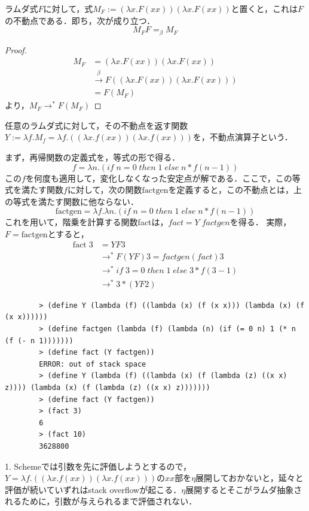 \documentclass[uplatex, dvipdfmx]{jsreport}
\begin{document}
\begin{proposition}
    ラムダ式$F$に対して，式$M_F:=(\lambda x.F(xx))(\lambda x.F(xx))$と置くと，これは$F$の不動点である．即ち，次が成り立つ．
    \[ M_FF=_\beta M_F \]
\end{proposition}
\begin{proof}
    \begin{align*}
        M_F &= (\lambda x.F(xx))(\lambda x.F(xx)) \\
        &\xrightarrow{\beta} F((\lambda x.F(xx))(\lambda x.F(xx))) \\
        &= F(M_F)
    \end{align*}
    より，$M_F\to^*F(M_F)$
\end{proof}
\begin{definition}
    任意のラムダ式に対して，その不動点を返す関数$Y:=\lambda f.M_f=\lambda f.((\lambda x.f(xx))(\lambda x.f(xx)))$を，不動点演算子という．
\end{definition}

\begin{example}[再帰関数の表現：階乗]
    まず，再帰関数の定義式を，等式の形で得る．
    \[ f=\lambda n.(if\; n=0\;then\;1\;else\;n*f(n-1)) \]
    この$f$を何度も適用して，変化しなくなった安定点が解である．ここで，この等式を満たす関数$f$に対して，次の関数$\mathrm{factgen}$を定義すると，この不動点とは，上の等式を満たす関数に他ならない．
    \[ \mathrm{factgen}=\lambda f.\lambda n.(if\; n=0\;then\;1\;else\;n*f(n-1)) \]
    これを用いて，階乗を計算する関数factは，$fact=Y\; factgen$を得る．
    実際，$F=\mathrm{factgen}$とすると，
    \begin{align*}
        \mathrm{fact}\;3 &= YF3\\
        &\to^* F(YF)3 = factgen(fact)3 \\
        &\to^* if\; 3=0\;then\;1\;else\;3*f(3-1) \\
        &\to^* 3*(YF2)
    \end{align*}
\end{example}
\begin{example}[Scheme]
    \begin{lstlisting}
        > (define Y (lambda (f) ((lambda (x) (f (x x))) (lambda (x) (f (x x))))))
        > (define factgen (lambda (f) (lambda (n) (if (= 0 n) 1 (* n (f (- n 1)))))))
        > (define fact (Y factgen))
        ERROR: out of stack space
        > (define Y (lambda (f) ((lambda (x) (f (lambda (z) ((x x) z)))) (lambda (x) (f (lambda (z) ((x x) z)))))))
        > (define fact (Y factgen))
        > (fact 3)
        6
        > (fact 10)
        3628800
    \end{lstlisting}
    1. Schemeでは引数を先に評価しようとするので，$Y=\lambda f.((\lambda x.f(xx))(\lambda x.f(xx)))$の$xx$部を$\eta$展開しておかないと，延々と評価が続いていずれはstack overflowが起こる．$\eta$展開するとそこがラムダ抽象されるために，引数が与えられるまで評価されない．
\end{example}
\end{document}
